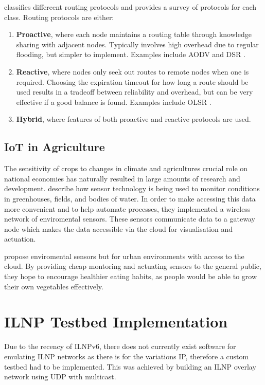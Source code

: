 \documentclass[12pt]{article}
\begin{document}
\cite{hassan} classifies differeent routing protocols and provides a survey of protocols for each class. Routing protocols are either:
\begin{enumerate}
    \item \textbf{Proactive}, where each node maintains a routing table through knowledge sharing with adjacent nodes. Typically involves high overhead due to regular flooding, but simpler to implement.
        Examples include AODV \cite{aodv} and DSR \cite{dsr}.

    \item \textbf{Reactive}, where nodes only seek out routes to remote nodes when one is required. Choosing the expiration timeout for how long a route should be used results in a tradeoff between reliability and overhead, but can be very effective if a good balance is found.
        Examples include OLSR \cite{olsr}.
    \item \textbf{Hybrid}, where features of both proactive and reactive protocols are used.
\end{enumerate}

\subsection{IoT in Agriculture}

The sensitivity of crops to changes in climate and agricultures crucial role on national economies has naturally resulted in large amounts of research and development. \cite{agrisensor} describe how sensor technology is being used to monitor conditions in greenhouses, fields, and bodies of water. In order to make accessing this data more convenient and to help automate processes, they implemented a wireless network of enviromental sensors. These sensors communicate data to a gateway node which makes the data accessible via the cloud for visualisation and actuation. 

\cite{indoor} propose enviromental sensors but for urban environments with access to the cloud. By providing cheap montoring and actuating sensors to the general public, they hope to encourage healthier eating habits, as people would be able to grow their own vegetables effectively. 

\section{ILNP Testbed Implementation}

Due to the recency of ILNPv6, there does not currently exist software for emulating ILNP networks as there is for the variations IP, therefore a custom testbed had to be implemented. This was achieved by building an ILNP overlay network using UDP with multicast. 
\end{document}
